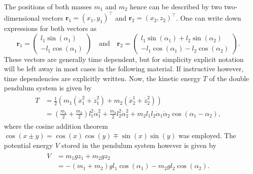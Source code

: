 \documentclass{report}
\numberwithin{tm}{section}
\newcommand\vect[1]{\ensuremath{\bm{#1}}}
\begin{document}
The positions of both masses $m_1$ and $m_2$ hence can be described by two two-dimensional vectors $\vect{r}_1 = (x_1,y_1)^\top$ and $\vect{r}_2 = (x_2, z_2)^\top$. One can write down expressions for both vectors as \begin{equation}
	\vect{r}_1 = \begin{pmatrix}
	l_1\sin(\alpha_1) \\ -l_1\cos(\alpha_1)
	\end{pmatrix} \quad \text{and} \quad \vect{r}_2 = \begin{pmatrix}
	l_1\sin(\alpha_1) + l_2\sin(\alpha_2) \\ -l_1\cos(\alpha_1) - l_2\cos(\alpha_2)
	\end{pmatrix}.
\end{equation} These vectors are generally time dependent, but for simplicity explicit notation will be left away in most cases in the following material. If instructive however, time dependencies are explicitly written. Now, the kinetic energy $T$ of the double pendulum system is given by \begin{align}
\begin{aligned}
	T &= \frac{1}{2}\left(m_1(\dot{x}_1^2 + \dot{z}_1^2) + m_2(\dot{x}_2^1 + \dot{z}_2^2)\right) \\
	&= \left(\frac{m_1}{2}+\frac{m_2}{2}\right)l_1^2 \dot{\alpha}_1^2 + \frac{m_2}{2}l_2^2\dot{\alpha}_2^2 + m_2l_1l_2\dot{\alpha}_1\dot{\alpha}_2\cos(\alpha_1-\alpha_2),
\end{aligned}
\end{align} where the cosine addition theorem $\cos(x \pm y) = \cos(x)\cos(y) \mp \sin(x)\sin(y)$ was employed. The potential energy $V$ stored in the pendulum system however is given by \begin{align}\begin{aligned}
V &= m_1gz_1 + m_2gz_2  \\
 &= -(m_1+m_2)gl_1\cos(\alpha_1) - m_2gl_2\cos(\alpha_2).
\end{aligned}\end{align}
\end{document}
